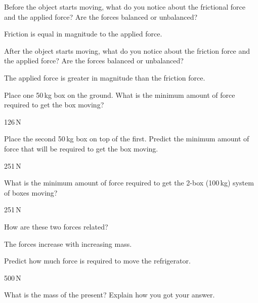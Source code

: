 \documentclass[answers]{exam}
\begin{document}
\begin{questions}
\question
Before the object starts moving, what do you notice about the frictional force and the applied force? Are the forces balanced or unbalanced?

\begin{solution}
    Friction is equal in magnitude to the applied force.
\end{solution}

\question 
After the object starts moving, what do you notice about the friction force and the applied force? Are the forces balanced or unbalanced?

\begin{solution}
    The applied force is greater in magnitude than the friction force.
\end{solution}

\question
Place one 50\,kg box on the ground. What is the minimum amount of force required to get the box moving?

\begin{solution}
    126\,N
\end{solution}

\question
Place the second 50\,kg box on top of the first. Predict the minimum amount of force that will be required to get the box moving.

\begin{solution}
    251\,N
\end{solution}

\question
What is the minimum amount of force required to get the 2-box (100\,kg) system of boxes moving?

\begin{solution}
    251\,N
\end{solution}

\question
How are these two forces related?

\begin{solution}
    The forces increase with increasing mass. 
\end{solution}

\question
Predict how much force is required to move the refrigerator.

\begin{solution}
    500\,N
\end{solution}

\question \label{HPDAU}
What is the mass of the present? Explain how you got your answer.

\end{questions}

\clearpage
\end{document}
